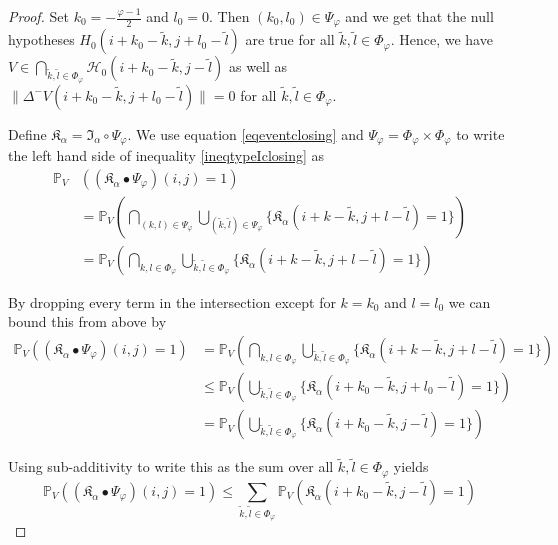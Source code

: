 \documentclass[a4paper,12pt]{article}
\newcommand{\norm}[1]{\lVert#1\rVert}
\theoremstyle{plain}
\theoremstyle{definition}
\begin{document}
\begin{proof}
	Set $k_0 = -\frac{\varphi - 1}{2}$ and $l_0 = 0$. Then $(k_0, l_0) \in \Psi_\varphi$ and we get that the null hypotheses $H_0(i + k_0 - \tilde{k}, j + l_0 - \tilde{l})$ are true for all $\tilde{k}, \tilde{l} \in \Phi_\varphi$. Hence, we have $V \in \bigcap_{\tilde{k}, \tilde{l} \in \Phi_\varphi} \mathcal{H}_0(i + k_0 - \tilde{k}, j - \tilde{l})$ as well as $\norm{\Delta^- V(i + k_0 - \tilde{k}, j + l_0 - \tilde{l})} = 0$ for all $\tilde{k}, \tilde{l} \in \Phi_\varphi$.
	
	Define $\mathfrak{K}_\alpha = \mathfrak{I}_\alpha \circ \Psi_\varphi$. We use equation \eqref{eqeventclosing} and $\Psi_\varphi = \Phi_\varphi \times \Phi_\varphi$ to write the left hand side of inequality \eqref{ineqtypeIclosing} as
	\begin{align*}
		\mathbb{P}_V&( (\mathfrak{K}_\alpha \bullet \Psi_\varphi)(i, j) = 1 ) \\
		&= \mathbb{P}_V\left( \bigcap_{(k, l) \in \Psi_\varphi} \bigcup_{(\tilde{k}, \tilde{l}) \in \Psi_\varphi} \{ \mathfrak{K}_\alpha(i + k - \tilde{k}, j + l - \tilde{l}) = 1 \} \right) \\
		&= \mathbb{P}_V\left( \bigcap_{k, l \in \Phi_\varphi} \bigcup_{\tilde{k}, \tilde{l} \in \Phi_\varphi} \{ \mathfrak{K}_\alpha(i + k - \tilde{k}, j + l - \tilde{l}) = 1 \} \right)
	\end{align*}
	
	By dropping every term in the intersection except for $k = k_0$ and $l = l_0$ we can bound this from above by
	\begin{align*}
		\mathbb{P}_V( (\mathfrak{K}_\alpha \bullet \Psi_\varphi)(i, j) = 1 ) &= \mathbb{P}_V\left( \bigcap_{k, l \in \Phi_\varphi} \bigcup_{\tilde{k}, \tilde{l} \in \Phi_\varphi} \{ \mathfrak{K}_\alpha(i + k - \tilde{k}, j + l - \tilde{l}) = 1 \} \right) \\
		&\leq \mathbb{P}_V\left( \bigcup_{\tilde{k}, \tilde{l} \in \Phi_\varphi} \{ \mathfrak{K}_\alpha(i + k_0 - \tilde{k}, j + l_0 - \tilde{l}) = 1 \} \right) \\
		&= \mathbb{P}_V\left( \bigcup_{\tilde{k}, \tilde{l} \in \Phi_\varphi} \{ \mathfrak{K}_\alpha(i + k_0 - \tilde{k}, j - \tilde{l}) = 1 \} \right)
	\end{align*}
	
	Using sub-additivity to write this as the sum over all $\tilde{k}, \tilde{l} \in \Phi_\varphi$ yields
	\begin{equation*}
		\mathbb{P}_V( (\mathfrak{K}_\alpha \bullet \Psi_\varphi)(i, j) = 1 ) \leq \sum_{\tilde{k}, \tilde{l} \in \Phi_\varphi} \mathbb{P}_V\left( \mathfrak{K}_\alpha(i + k_0 - \tilde{k}, j - \tilde{l}) = 1 \right)
	\end{equation*}
	

\end{proof}
\end{document}
